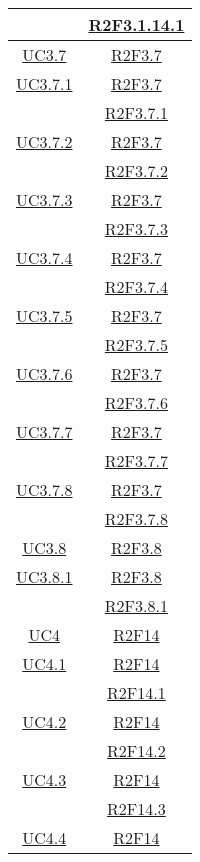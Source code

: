 \begin{longtable}{|c|c|}
& \hyperlink{R2F3.1.14.1}{R2F3.1.14.1}\\
\hline
\hyperlink{UC3.7}{UC3.7} & \hyperlink{R2F3.7}{R2F3.7}\\
\hline
\hyperlink{UC3.7.1}{UC3.7.1} & \hyperlink{R2F3.7}{R2F3.7}\\
& \hyperlink{R2F3.7.1}{R2F3.7.1}\\
\hline
\hyperlink{UC3.7.2}{UC3.7.2} & \hyperlink{R2F3.7}{R2F3.7}\\
& \hyperlink{R2F3.7.2}{R2F3.7.2}\\
\hline
\hyperlink{UC3.7.3}{UC3.7.3} & \hyperlink{R2F3.7}{R2F3.7}\\
& \hyperlink{R2F3.7.3}{R2F3.7.3}\\
\hline
\hyperlink{UC3.7.4}{UC3.7.4} & \hyperlink{R2F3.7}{R2F3.7}\\
& \hyperlink{R2F3.7.4}{R2F3.7.4}\\
\hline
\hyperlink{UC3.7.5}{UC3.7.5} & \hyperlink{R2F3.7}{R2F3.7}\\
& \hyperlink{R2F3.7.5}{R2F3.7.5}\\
\hline
\hyperlink{UC3.7.6}{UC3.7.6} & \hyperlink{R2F3.7}{R2F3.7}\\
& \hyperlink{R2F3.7.6}{R2F3.7.6}\\
\hline
\hyperlink{UC3.7.7}{UC3.7.7} & \hyperlink{R2F3.7}{R2F3.7}\\
& \hyperlink{R2F3.7.7}{R2F3.7.7}\\
\hline
\hyperlink{UC3.7.8}{UC3.7.8} & \hyperlink{R2F3.7}{R2F3.7}\\
& \hyperlink{R2F3.7.8}{R2F3.7.8}\\
\hline
\hyperlink{UC3.8}{UC3.8} & \hyperlink{R2F3.8}{R2F3.8}\\
\hline
\hyperlink{UC3.8.1}{UC3.8.1} & \hyperlink{R2F3.8}{R2F3.8}\\
& \hyperlink{R2F3.8.1}{R2F3.8.1}\\
\hline
\hyperlink{UC4}{UC4} & \hyperlink{R2F14}{R2F14}\\
\hline
\hyperlink{UC4.1}{UC4.1} & \hyperlink{R2F14}{R2F14}\\
& \hyperlink{R2F14.1}{R2F14.1}\\
\hline
\hyperlink{UC4.2}{UC4.2} & \hyperlink{R2F14}{R2F14}\\
& \hyperlink{R2F14.2}{R2F14.2}\\
\hline
\hyperlink{UC4.3}{UC4.3} & \hyperlink{R2F14}{R2F14}\\
& \hyperlink{R2F14.3}{R2F14.3}\\
\hline
\hyperlink{UC4.4}{UC4.4} & \hyperlink{R2F14}{R2F14}\\

\end{longtable}
